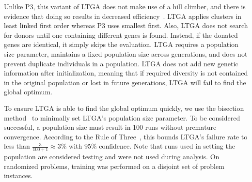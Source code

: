 \documentclass{sig-alternate}
\begin{document}
Unlike P3, this variant of LTGA does not make use of a hill climber,
and there is evidence that doing so results in decreased
efficiency~\cite{bosman:2011:lsbbo}.  LTGA applies clusters in least
linked first order whereas P3 uses smallest first.  Also, LTGA does
not search for donors until one containing different genes is found.
Instead, if the donated genes are identical, it simply skips the
evaluation.  LTGA requires a population size parameter, maintains a
fixed population size across generations, and does not prevent
duplicate individuals in a population.  LTGA does not add new genetic
information after initialization, meaning that if required diversity
is not contained in the original population or lost in future
generations, LTGA will fail to find the global optimum.

To ensure LTGA is able to find the global optimum quickly, we use the bisection method~\cite{goldman:2012:ltga}
to minimally set LTGA's population size parameter.  To be considered successful, a
population size must result in 100 runs without premature convergence.
According to the Rule of Three~\cite{jovanovic:1997:ruleofthree}, this bounds
LTGA's failure rate to less than $\frac{3}{100+1} \approx 3\%$ with 95\% confidence.
Note that runs used in setting the population are considered testing and were not
used during analysis.  On randomized problems, training was performed on a disjoint
set of problem instances.

\begin{comment}
Since LTGA requires a population size parameter, we thought it most fair to
compare against LTGA with an optimized population size, even though P3
receives no such tuning. To set the population size parameter, we use
the bisection method~\cite{goldman:2012:ltga}, which determines the minimum population
size required to meet a specified success criteria.  As P3 will run until the global optima
is found or the evaluation limit is reached, we want to ensure LTGA has a similar requirement
on its success.  Therefore, using the Rule of Three~\cite{jovanovic:1997:ruleofthree}, we
can provide a bound on the probability of failure $\frac{3}{k+1}$ with $95\%$ confidence,
where $k$ is a number of runs without a failure.  Here we state that a population size
is successful if it performs 100 runs without failing to find the global optimum, meaning
the probability of that population failing to solve problems of the same class is bounded above by
$3\%$.  Note that these 100 runs are considered training, and the results from the bisection
runs are not included during the comparative testing.  Furthermore, when testing on problem
classes, bisection is performed on a different set of instances than testing.
\end{comment}
\end{document}
